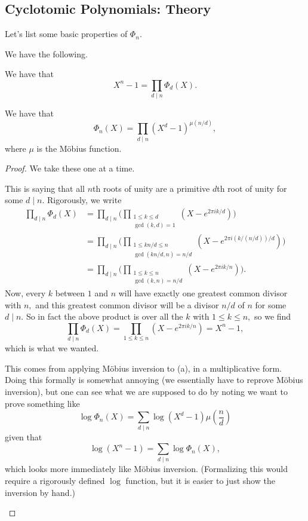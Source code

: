 \subsection{Cyclotomic Polynomials: Theory}
Let's list some basic properties of $\Phi_n.$
\begin{proposition}
	We have the following.
	\begin{listalph}
		\item We have that
		\[X^n-1=\prod_{d\mid n}\Phi_d(X).\]
		\item We have that
		\[\Phi_n(X)=\prod_{d\mid n}\left(X^d-1\right)^{\mu(n/d)},\]
		where $\mu$ is the M\"obius function.
	\end{listalph}
\end{proposition}
\begin{proof}
	We take these one at a time.
	\begin{listalph}
		\item This is saying that all $n$th roots of unity are a primitive $d$th root of unity for some $d\mid n.$ Rigorously, we write
		\begin{align*}
			\prod_{d\mid n}\Phi_d(X) &= \prod_{d\mid n}\bigg(\prod_{\substack{1\le k\le d\\\gcd(k,d)=1}}\left(X-e^{2\pi ik/d}\right)\bigg) \\
			&= \prod_{d\mid n}\bigg(\prod_{\substack{1\le kn/d\le n\\\gcd(kn/d,n)=n/d}}\left(X-e^{2\pi i(k/(n/d))/d}\right)\bigg) \\
			&= \prod_{d\mid n}\bigg(\prod_{\substack{1\le k\le n\\\gcd(k,n)=n/d}}\left(X-e^{2\pi ik/n}\right)\bigg).
		\end{align*}
		Now, every $k$ between $1$ and $n$ will have exactly one greatest common divisor with $n,$ and this greatest common divisor will be a divisor $n/d$ of $n$ for some $d\mid n.$ So in fact the above product is over all the $k$ with $1\le k\le n,$ so we find
		\[\prod_{d\mid n}\Phi_d(X)=\prod_{1\le k\le n}\left(X-e^{2\pi ik/n}\right)=X^n-1,\]
		which is what we wanted.
		\item This comes from applying M\"obius inversion to (a), in a multiplicative form. Doing this formally is somewhat annoying (we essentially have to reprove M\"obius inversion), but one can see what we are supposed to do by noting we want to prove something like
		\[\log\Phi_n(X)=\sum_{d\mid n}\log\left(X^d-1\right)\mu\left(\frac nd\right)\]
		given that
		\[\log\left(X^n-1\right)=\sum_{d\mid n}\log\Phi_n(X),\]
		which looks more immediately like M\"obius inversion. (Formalizing this would require a rigorously defined $\log$ function, but it is easier to just show the inversion by hand.)
		\qedhere
	\end{listalph}
\end{proof}
